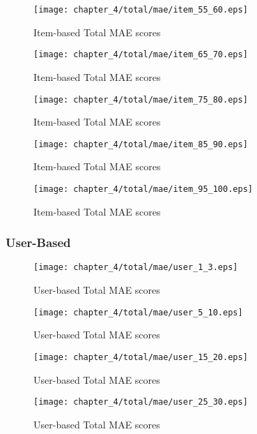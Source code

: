 \begin{figure}[H]
\centering
\texttt{[image: chapter\_4/total/mae/item\_55\_60.eps]}
\caption{Item-based Total MAE scores}
\end{figure}

\begin{figure}[H]
\centering
\texttt{[image: chapter\_4/total/mae/item\_65\_70.eps]}
\caption{Item-based Total MAE scores}
\end{figure}

\begin{figure}[H]
\centering
\texttt{[image: chapter\_4/total/mae/item\_75\_80.eps]}
\caption{Item-based Total MAE scores}
\end{figure}

\begin{figure}[H]
\centering
\texttt{[image: chapter\_4/total/mae/item\_85\_90.eps]}
\caption{Item-based Total MAE scores}
\end{figure}

\begin{figure}[H]
\centering
\texttt{[image: chapter\_4/total/mae/item\_95\_100.eps]}
\caption{Item-based Total MAE scores}
\end{figure}

\subsubsection{User-Based}

\begin{figure}[H]
\centering
\texttt{[image: chapter\_4/total/mae/user\_1\_3.eps]}
\caption{User-based Total MAE scores}
\end{figure}

\begin{figure}[H]
\centering
\texttt{[image: chapter\_4/total/mae/user\_5\_10.eps]}
\caption{User-based Total MAE scores}
\end{figure}

\begin{figure}[H]
\centering
\texttt{[image: chapter\_4/total/mae/user\_15\_20.eps]}
\caption{User-based Total MAE scores}
\end{figure}

\begin{figure}[H]
\centering
\texttt{[image: chapter\_4/total/mae/user\_25\_30.eps]}
\caption{User-based Total MAE scores}
\end{figure}

